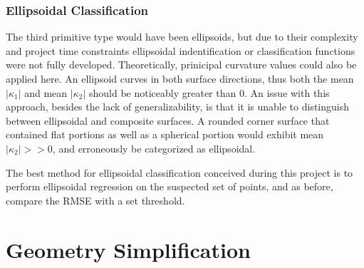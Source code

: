 \subsubsection{Ellipsoidal Classification}
The third primitive type would have been ellipsoids, but due to their complexity and project time constraints ellipsoidal indentification or classification functions were not fully developed.
Theoretically, prinicipal curvature values could also be applied here.
An ellipsoid curves in both surface directions, thus both the mean $|\kappa_1|$ and mean $|\kappa_2|$ should be noticeably greater than 0.
An issue with this approach, besides the lack of generalizability, is that it is unable to distinguish between ellipsoidal and composite surfaces.
A rounded corner surface that contained flat portions as well as a spherical portion would exhibit mean $|\kappa_2| >> 0$, and erroneously be categorized as ellipsoidal.

The best method for ellipsoidal classification conceived during this project is to perform ellipsoidal regression on the suspected set of points, and as before, compare the RMSE with a set threshold.

\section{Geometry Simplification}

